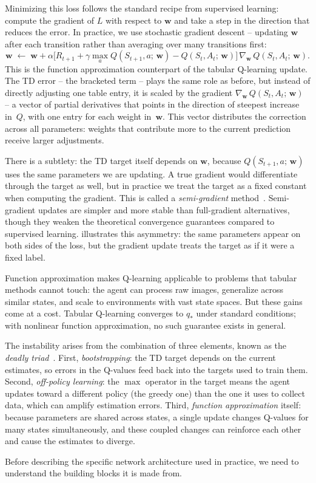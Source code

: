 \smallskip
Minimizing this loss follows the standard recipe from supervised
learning: compute the gradient of $L$ with respect to $\mathbf{w}$
and take a step in the direction that reduces the error. In
practice, we use stochastic gradient descent -- updating
$\mathbf{w}$ after each transition rather than averaging over many
transitions first:
%
\begin{equation}
\label{eq:sgd-update}
\mathbf{w} \;\leftarrow\; \mathbf{w}
  + \alpha \Big[R_{t+1} + \gamma \max_{a} Q(S_{t+1}, a;\, \mathbf{w})
  - Q(S_t, A_t;\, \mathbf{w})\Big]\,
  \nabla_{\mathbf{w}}\, Q(S_t, A_t;\, \mathbf{w}).
\end{equation}
%
This is the function approximation counterpart of the tabular
Q-learning update. The TD error -- the bracketed term -- plays the
same role as before, but instead of directly adjusting one table
entry, it is scaled by the gradient
$\nabla_{\mathbf{w}}\, Q(S_t, A_t;\, \mathbf{w})$ -- a vector of
partial derivatives that points in the direction of steepest
increase in~$Q$, with one entry for each weight
in~$\mathbf{w}$. This vector distributes the correction across all
parameters: weights that contribute more to the current prediction
receive larger adjustments.

\smallskip
There is a subtlety: the TD target itself depends on $\mathbf{w}$,
because $Q(S_{t+1}, a;\, \mathbf{w})$ uses the same parameters we
are updating. A true gradient would differentiate through the target
as well, but in practice we treat the target as a fixed constant
when computing the gradient. This is called a \emph{semi-gradient}
method~\citep{sutton2018reinforcement}. Semi-gradient updates are
simpler and more stable than full-gradient alternatives, though they
weaken the theoretical convergence guarantees compared to supervised
learning.  illustrates this asymmetry: the
same parameters appear on both sides of the loss, but the gradient
update treats the target as if it were a fixed label.



\smallskip
Function approximation makes Q-learning applicable to problems that
tabular methods cannot touch: the agent can process raw images,
generalize across similar states, and scale to environments with
vast state spaces. But these gains come at a cost. Tabular
Q-learning converges to $q_*$ under standard conditions; with
nonlinear function approximation, no such guarantee exists in
general.

\smallskip
The instability arises from the combination of three elements,
known as the \emph{deadly triad}~\citep{sutton2018reinforcement}.
First, \emph{bootstrapping}: the TD target depends on the current
estimates, so errors in the Q-values feed back into the targets
used to train them. Second, \emph{off-policy learning}: the $\max$
operator in the target means the agent updates toward a different
policy (the greedy one) than the one it uses to collect data,
which can amplify estimation errors. Third, \emph{function
approximation} itself: because parameters are shared across states,
a single update changes Q-values for many states simultaneously,
and these coupled changes can reinforce each other and cause the
estimates to diverge.

\smallskip
Before describing the specific network architecture used in
practice, we need to understand the building blocks it is made from.
